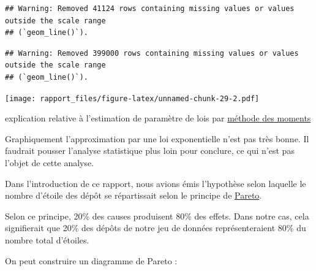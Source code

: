 \documentclass[
]{article}
\begin{document}
\begin{verbatim}
## Warning: Removed 41124 rows containing missing values or values outside the scale range
## (`geom_line()`).
\end{verbatim}

\begin{verbatim}
## Warning: Removed 399000 rows containing missing values or values outside the scale range
## (`geom_line()`).
\end{verbatim}

\texttt{[image: rapport\_files/figure-latex/unnamed-chunk-29-2.pdf]}

explication relative à l'estimation de paramètre de lois par
\href{https://fr.wikipedia.org/wiki/M\%C3\%A9thode_des_moments_(statistiques)}{méthode
des moments}

Graphiquement l'approximation par une loi exponentielle n'est pas très
bonne. Il faudrait pousser l'analyse statistique plus loin pour
conclure, ce qui n'est pas l'objet de cette analyse.

Dans l'introduction de ce rapport, nous avions émis l'hypothèse selon
laquelle le nombre d'étoile des dépôt se répartissait selon le principe
de \href{https://fr.wikipedia.org/wiki/Principe_de_Pareto}{Pareto}.

Selon ce principe, 20\% des causes produisent 80\% des effets. Dans
notre cas, cela signifierait que 20\% des dépôts de notre jeu de données
représenteraient 80\% du nombre total d'étoiles.

On peut construire un diagramme de Pareto :
\end{document}
